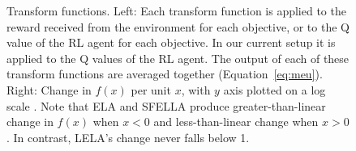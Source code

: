 \begin{figure}[h]
  \caption{Transform functions. Left: Each transform function is applied to the reward received from the environment for each objective, or to the Q value of the RL agent for each objective. In our current setup it is applied to the Q values of the RL agent.
  The output of each of these transform functions are averaged together %
  (Equation~\ref{eq:meu}). Right: Change in $f(x)$ per unit $x$, with $y$ axis plotted on a log scale%
  . Note that ELA and SFELLA produce greater-than-linear change in $f(x)$ when $x<0$ and less-than-linear change when $x>0$. In contrast, LELA's change never falls below 1.}
  \label{fig:transform_functions}
\end{figure}

